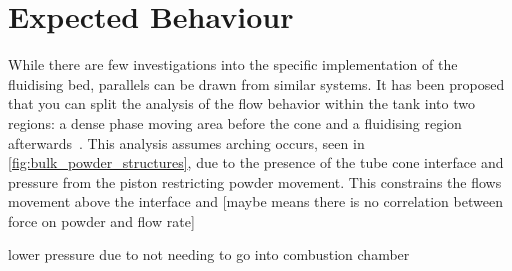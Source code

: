 \section{Expected Behaviour}
While there are few investigations into the specific implementation of the fluidising bed, parallels can be drawn from similar systems. It has been proposed that you can split the analysis of the flow behavior within the tank into two regions: a dense phase moving area before the cone and a fluidising region afterwards~\cite{Tang22}. This analysis assumes arching occurs, seen in \autoref{fig:bulk_powder_structures}, due to the presence of the tube cone interface and pressure from the piston restricting powder movement. This constrains the flows movement above the interface and [maybe means there is no correlation between force on powder and flow rate]

lower pressure due to not needing to go into combustion chamber


